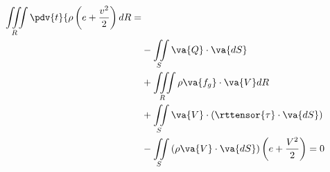 \begin{equation}
  \begin{split}
  \iiint\limits_R\pdv{t}\{\rho\left(e + \frac{v^2}{2}\right)dR = \\
    & - \iint\limits_S\va{Q}\cdot\va{dS} \\
    & + \iiint\limits_R\rho\va{f_g}\cdot\va{V} dR \\ 
    & + \iint\limits_S\va{V}\cdot\left(\rttensor{\tau}\cdot\va{dS}\right) \\ 
    & - \iint\limits_S\left(\rho\va{V} \cdot\va{dS}\right)\left(e + \frac{V^2}{2}\right) = 0
  \end{split}
\end{equation}

